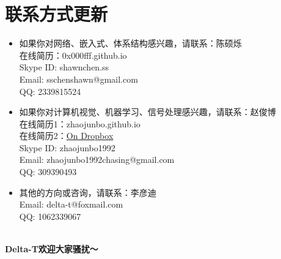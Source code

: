 \documentclass{article}
\begin{document}
\section{联系方式更新}
\begin{itemize}
\item{如果你对网络、嵌入式、体系结构感兴趣，请联系：陈硕烁\\
在线简历：0x000fff.github.io\\
Skype ID: shawnchen.ss\\
Email: sschenshawn@gmail.com\\
QQ: 2339815524}
\item{如果你对计算机视觉、机器学习、信号处理感兴趣，请联系：赵俊博\\
在线简历1：zhaojunbo.github.io\\
在线简历2：\href{https://www.dropbox.com/s/layknk0qbke541c/res9a_JunboZhao.pdf}{\textcolor{colorname}{On Dropbox}}\\
Skype ID: zhaojunbo1992\\
Email: zhaojunbo1992chasing@gmail.com\\
QQ: 309390493}
\item{其他的方向或咨询，请联系：李彦迪\\
Email: delta-t@foxmail.com\\
QQ: 1062339067}
\end{itemize}
\\
\vspace{20pt}
{\large\bf Delta-T欢迎大家骚扰～}
\end{document}
